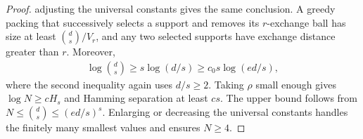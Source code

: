 \documentclass[10pt,a4paper]{amsart}
\begin{document}
\begin{proof}
	adjusting the universal constants gives the same conclusion.
A greedy packing that successively selects a support and removes its
$r$-exchange ball has size at least $\binom ds/V_r$, and any two
selected supports have exchange distance greater than $r$.
Moreover,
\begin{align*}
    \log\binom ds\geq s\log(d/s)\geq c_0s\log(ed/s),
\end{align*}
where the second inequality again uses $d/s\geq2$.  Taking $\rho$
small enough gives $\log N\geq cH_s$ and Hamming separation at least
$cs$.  The upper bound follows from
$N\leq\binom ds\leq(ed/s)^s$.  Enlarging or decreasing the universal
constants handles the finitely many smallest values and ensures
$N\geq4$.
\end{proof}
\end{document}
